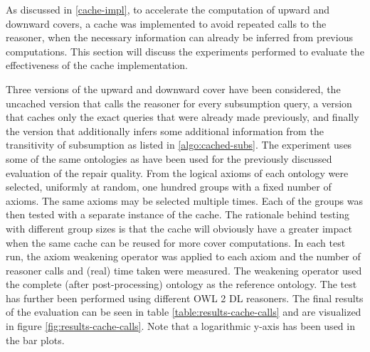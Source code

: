 
As discussed in \cref{cache-impl}, to accelerate the computation of upward and downward covers, a cache was implemented to avoid repeated calls to the reasoner, when the necessary information can already be inferred from previous computations. This section will discuss the experiments performed to evaluate the effectiveness of the cache implementation.

Three versions of the upward and downward cover have been considered, the uncached version that calls the reasoner for every subsumption query, a version that caches only the exact queries that were already made previously, and finally the version that additionally infers some additional information from the transitivity of subsumption as listed in \cref{algo:cached-subs}. The experiment uses some of the same ontologies as have been used for the previously discussed evaluation of the repair quality. From the logical axioms of each ontology were selected, uniformly at random, one hundred groups with a fixed number of axioms. The same axioms may be selected multiple times. Each of the groups was then tested with a separate instance of the cache. The rationale behind testing with different group sizes is that the cache will obviously have a greater impact when the same cache can be reused for more cover computations. In each test run, the axiom weakening operator was applied to each axiom and the number of reasoner calls and (real) time taken were measured. The weakening operator used the complete (after post-processing) ontology as the reference ontology. The test has further been performed using different OWL 2 DL reasoners. The final results of the evaluation can be seen in table \cref{table:results-cache-calls} and are visualized in figure \cref{fig:results-cache-calls}. Note that a logarithmic y-axis has been used in the bar plots.


